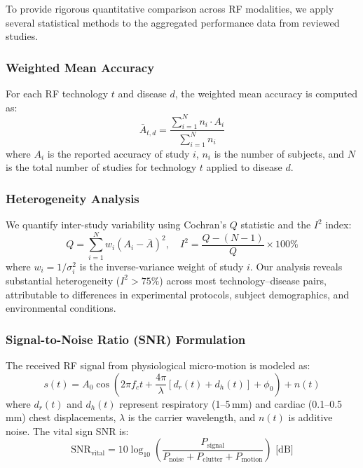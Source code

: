 \documentclass[journal,twoside]{IEEEtran}
\begin{document}
To provide rigorous quantitative comparison across RF modalities, we apply several statistical methods to the aggregated performance data from reviewed studies.

\subsubsection{Weighted Mean Accuracy}

For each RF technology $t$ and disease $d$, the weighted mean accuracy is computed as:
\begin{equation}
\bar{A}_{t,d} = \frac{\sum_{i=1}^{N} n_i \cdot A_i}{\sum_{i=1}^{N} n_i}
\label{eq:weighted_mean}
\end{equation}
where $A_i$ is the reported accuracy of study $i$, $n_i$ is the number of subjects, and $N$ is the total number of studies for technology $t$ applied to disease $d$.

\subsubsection{Heterogeneity Analysis}

We quantify inter-study variability using Cochran's $Q$ statistic and the $I^2$ index:
\begin{equation}
Q = \sum_{i=1}^{N} w_i (A_i - \bar{A})^2, \quad I^2 = \frac{Q - (N-1)}{Q} \times 100\%
\label{eq:heterogeneity}
\end{equation}
where $w_i = 1/\sigma_i^2$ is the inverse-variance weight of study $i$. Our analysis reveals substantial heterogeneity ($I^2 > 75\%$) across most technology--disease pairs, attributable to differences in experimental protocols, subject demographics, and environmental conditions.

\subsubsection{Signal-to-Noise Ratio (SNR) Formulation}

The received RF signal from physiological micro-motion is modeled as:
\begin{equation}
s(t) = A_0 \cos\left(2\pi f_c t + \frac{4\pi}{\lambda}\left[d_r(t) + d_h(t)\right] + \phi_0\right) + n(t)
\label{eq:rf_signal}
\end{equation}
where $d_r(t)$ and $d_h(t)$ represent respiratory (1--5\,mm) and cardiac (0.1--0.5\,mm) chest displacements, $\lambda$ is the carrier wavelength, and $n(t)$ is additive noise. The vital sign SNR is:
\begin{equation}
\text{SNR}_{\text{vital}} = 10\log_{10}\left(\frac{P_{\text{signal}}}{P_{\text{noise}} + P_{\text{clutter}} + P_{\text{motion}}}\right) \text{ [dB]}
\label{eq:snr}
\end{equation}
\end{document}
